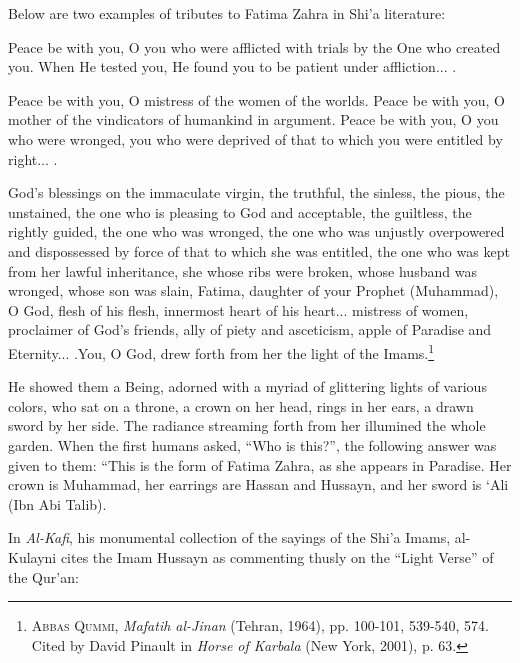 Below are two examples of tributes to Fatima Zahra in Shi'a literature:

\begin{quotationx}
Peace be with you, O you who were afflicted with trials by the One who created you. When He tested you, He found you to be patient under affliction... .

Peace be with you, O mistress of the women of the worlds. Peace be with you, O mother of the vindicators of humankind in argument. Peace be with you, O you who were wronged, you who were deprived of that to which you were entitled by right... .

God's blessings on the immaculate virgin, the truthful, the sinless, the pious, the unstained, the one who is pleasing to God and acceptable, the guiltless, the rightly guided, the one who was wronged, the one who was unjustly overpowered and dispossessed by force of that to which she was entitled, the one who was kept from her lawful inheritance, she whose ribs were broken, whose husband was wronged, whose son was slain, Fatima, daughter of your Prophet (Muhammad), O God, flesh of his flesh, innermost heart of his heart... mistress of women, proclaimer of God's friends, ally of piety and asceticism, apple of Paradise and Eternity... .You, O God, drew forth from her the light of the Imams.\footnote{\textsc{Abbas Qummi}, \emph{Mafatih al-Jinan} (Tehran, 1964), pp. 100-101, 539-540, 574. Cited by David Pinault in \emph{Horse of Karbala} (New York, 2001), p. 63.}

He showed them a Being, adorned with a myriad of glittering lights of various colors, who sat on a throne, a crown on her head, rings in her ears, a drawn sword by her side. The radiance streaming forth from her illumined the whole garden. When the first humans asked, ``Who is this?'', the following answer was given to them: ``This is the form of Fatima Zahra, as she appears in Paradise. Her crown is Muhammad, her earrings are Hassan and Hussayn, and her sword is `Ali (Ibn Abi Talib).
\end{quotationx}

In \emph{Al-Kafi}, his monumental collection of the sayings of the Shi'a Imams, al-Kulayni cites the Imam Hussayn as commenting thusly on the ``Light Verse'' of the Qur'an:

